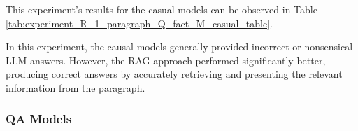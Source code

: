 \documentclass{wseas}
\begin{document}

This experiment's results for the casual models can be observed in 
Table \ref{tab:experiment_R_1_paragraph_Q_fact_M_casual_table}.

In this experiment, the causal models generally provided incorrect or
nonsensical LLM answers. However, the RAG approach performed
significantly better, producing correct answers by accurately retrieving
and presenting the relevant information from the paragraph.

\subsubsection{QA Models}
\end{document}
